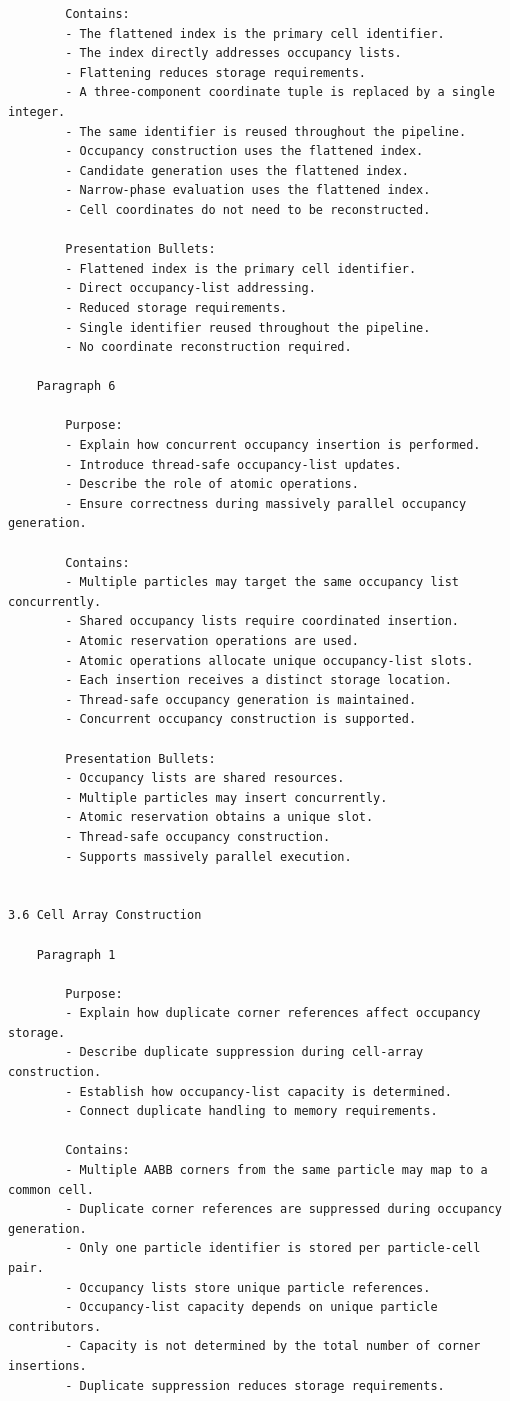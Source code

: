 \begin{verbatim}
		Contains:
		- The flattened index is the primary cell identifier.
		- The index directly addresses occupancy lists.
		- Flattening reduces storage requirements.
		- A three-component coordinate tuple is replaced by a single integer.
		- The same identifier is reused throughout the pipeline.
		- Occupancy construction uses the flattened index.
		- Candidate generation uses the flattened index.
		- Narrow-phase evaluation uses the flattened index.
		- Cell coordinates do not need to be reconstructed.

		Presentation Bullets:
		- Flattened index is the primary cell identifier.
		- Direct occupancy-list addressing.
		- Reduced storage requirements.
		- Single identifier reused throughout the pipeline.
		- No coordinate reconstruction required.

	Paragraph 6

		Purpose:
		- Explain how concurrent occupancy insertion is performed.
		- Introduce thread-safe occupancy-list updates.
		- Describe the role of atomic operations.
		- Ensure correctness during massively parallel occupancy generation.

		Contains:
		- Multiple particles may target the same occupancy list concurrently.
		- Shared occupancy lists require coordinated insertion.
		- Atomic reservation operations are used.
		- Atomic operations allocate unique occupancy-list slots.
		- Each insertion receives a distinct storage location.
		- Thread-safe occupancy generation is maintained.
		- Concurrent occupancy construction is supported.

		Presentation Bullets:
		- Occupancy lists are shared resources.
		- Multiple particles may insert concurrently.
		- Atomic reservation obtains a unique slot.
		- Thread-safe occupancy construction.
		- Supports massively parallel execution.


3.6 Cell Array Construction

	Paragraph 1

		Purpose:
		- Explain how duplicate corner references affect occupancy storage.
		- Describe duplicate suppression during cell-array construction.
		- Establish how occupancy-list capacity is determined.
		- Connect duplicate handling to memory requirements.

		Contains:
		- Multiple AABB corners from the same particle may map to a common cell.
		- Duplicate corner references are suppressed during occupancy generation.
		- Only one particle identifier is stored per particle-cell pair.
		- Occupancy lists store unique particle references.
		- Occupancy-list capacity depends on unique particle contributors.
		- Capacity is not determined by the total number of corner insertions.
		- Duplicate suppression reduces storage requirements.


\end{verbatim}
